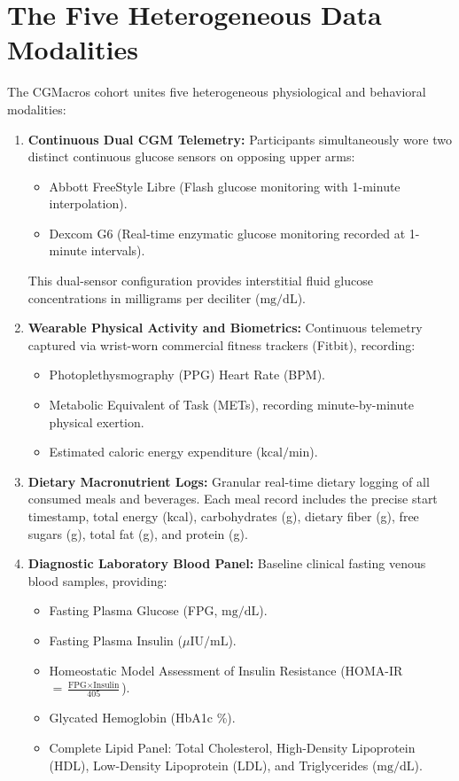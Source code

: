 \section{The Five Heterogeneous Data Modalities}
The CGMacros cohort unites five heterogeneous physiological and behavioral modalities:

\begin{enumerate}
    \item \textbf{Continuous Dual CGM Telemetry:} Participants simultaneously wore two distinct continuous glucose sensors on opposing upper arms:
    \begin{itemize}
        \item Abbott FreeStyle Libre (Flash glucose monitoring with 1-minute interpolation).
        \item Dexcom G6 (Real-time enzymatic glucose monitoring recorded at 1-minute intervals).
    \end{itemize}
    This dual-sensor configuration provides interstitial fluid glucose concentrations in milligrams per deciliter ($\text{mg/dL}$).
    
    \item \textbf{Wearable Physical Activity and Biometrics:} Continuous telemetry captured via wrist-worn commercial fitness trackers (Fitbit), recording:
    \begin{itemize}
        \item Photoplethysmography (PPG) Heart Rate (BPM).
        \item Metabolic Equivalent of Task (METs), recording minute-by-minute physical exertion.
        \item Estimated caloric energy expenditure ($\text{kcal/min}$).
    \end{itemize}
    
    \item \textbf{Dietary Macronutrient Logs:} Granular real-time dietary logging of all consumed meals and beverages. Each meal record includes the precise start timestamp, total energy (kcal), carbohydrates (g), dietary fiber (g), free sugars (g), total fat (g), and protein (g).
    
    \item \textbf{Diagnostic Laboratory Blood Panel:} Baseline clinical fasting venous blood samples, providing:
    \begin{itemize}
        \item Fasting Plasma Glucose (FPG, $\text{mg/dL}$).
        \item Fasting Plasma Insulin ($\mu\text{IU/mL}$).
        \item Homeostatic Model Assessment of Insulin Resistance (HOMA-IR $= \frac{\text{FPG} \times \text{Insulin}}{405}$).
        \item Glycated Hemoglobin (HbA1c \%).
        \item Complete Lipid Panel: Total Cholesterol, High-Density Lipoprotein (HDL), Low-Density Lipoprotein (LDL), and Triglycerides ($\text{mg/dL}$).
    \end{itemize}
    

\end{enumerate}
